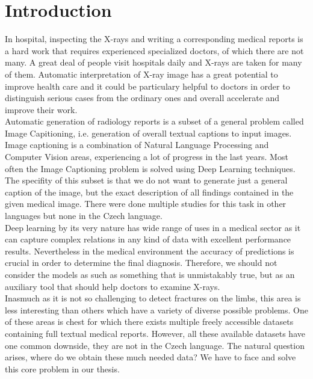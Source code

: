 \chapter*{Introduction}

In hospital, inspecting the X-rays and writing a corresponding medical reports is a hard work that requires experienced specialized doctors, of which there are not many. A great deal of people visit hospitals daily and X-rays are taken for many of them. Automatic interpretation of X-ray image has a great potential to improve health care and it could be particulary helpful to doctors in order to distinguish serious cases from the ordinary ones and overall accelerate and improve their work.\\

Automatic generation of radiology reports is a subset of a general problem called Image Capitioning, i.e. generation of overall textual captions to input images. Image captioning is a combination of Natural Language Processing and Computer Vision areas, experiencing a lot of progress in the last years. Most often the Image Captioning problem is solved using Deep Learning techniques. The specifity of this subset is that we do not want to generate just a general caption of the image, but the exact description of all findings contained in the given medical image. There were done multiple studies for this task in other languages but none in the Czech language.\\

Deep learning by its very nature has wide range of uses in a medical sector as it can capture complex relations in any kind of data with excellent performance results. Nevertheless in the medical environment the accuracy of predictions is crucial in order to determine the final diagnosis. Therefore, we should not consider the models as such as something that is unmistakably true, but as an auxiliary tool that should help doctors to examine X-rays.\\

Inasmuch as it is not so challenging to detect fractures on the limbs, this area is less interesting than others which have a variety of diverse possible problems. One of these areas is chest for which there exists multiple freely accessible datasets containing full textual medical reports. However, all these available datasets have one common downside, they are not in the Czech language. The natural question arises, where do we obtain these much needed data? We have to face and solve this core problem in our thesis.\\

